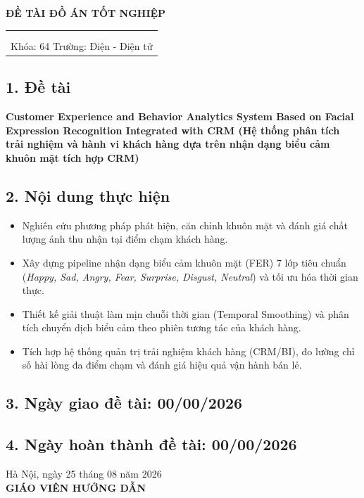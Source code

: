 \centerline{\textbf{\large ĐỀ TÀI ĐỒ ÁN TỐT NGHIỆP}}

\begin{table}[H]
    \centering
    \begin{tabular}{l r}
    \fontsize{14pt}{0pt}\selectfont {Họ và tên sinh viên 1: Nguyễn Văn A}    & \fontsize{14pt}{0pt}\selectfont {MSSV: 2019xxxx}\\
    \fontsize{14pt}{0pt}\selectfont {Họ và tên sinh viên 2: Nguyễn Thị B}    & \fontsize{14pt}{0pt}\selectfont {MSSV: 2019xxxx}\\
    \multicolumn{2}{c}{Khóa: 64 \hspace{2.5cm} Trường: Điện - Điện tử}
\end{tabular}
\end{table}
\subsection*{\textnormal{1. Đề tài}}
\textbf{Customer Experience and Behavior Analytics System Based on Facial Expression Recognition Integrated with CRM (Hệ thống phân tích trải nghiệm và hành vi khách hàng dựa trên nhận dạng biểu cảm khuôn mặt tích hợp CRM)}

\subsection*{\textnormal{2. Nội dung thực hiện}}
\begin{itemize}
    \item Nghiên cứu phương pháp phát hiện, căn chỉnh khuôn mặt và đánh giá chất lượng ảnh thu nhận tại điểm chạm khách hàng.
    \item Xây dựng pipeline nhận dạng biểu cảm khuôn mặt (FER) 7 lớp tiêu chuẩn (\textit{Happy, Sad, Angry, Fear, Surprise, Disgust, Neutral}) và tối ưu hóa thời gian thực.
    \item Thiết kế giải thuật làm mịn chuỗi thời gian (Temporal Smoothing) và phân tích chuyển dịch biểu cảm theo phiên tương tác của khách hàng.
    \item Tích hợp hệ thống quản trị trải nghiệm khách hàng (CRM/BI), đo lường chỉ số hài lòng đa điểm chạm và đánh giá hiệu quả vận hành bán lẻ.
\end{itemize}

\subsection*{\textnormal{3. Ngày giao đề tài: 00/00/2026}}

\subsection*{\textnormal{4. Ngày hoàn thành đề tài: 00/00/2026}}

\begin{flushright}
Hà Nội, ngày 25 tháng 08 năm 2026\\
\textbf{GIÁO VIÊN HƯỚNG DẪN}
\end{flushright}
\newpage